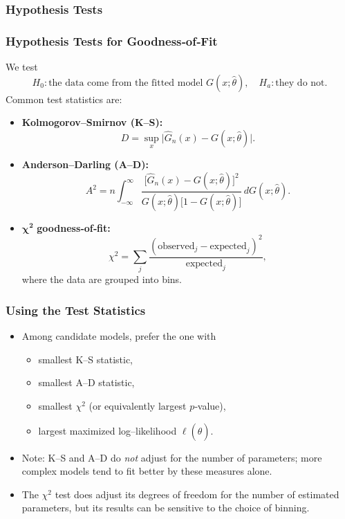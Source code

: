 \documentclass[11pt]{article}
\begin{document}
\subsubsection{Hypothesis Tests}
\subsubsection{Hypothesis Tests for Goodness‐of‐Fit}

We test
\[
  H_0: \text{the data come from the fitted model }G(x;\widehat\theta),
  \quad
  H_a: \text{they do not}.
\]
Common test statistics are:
\begin{itemize}
  \item \textbf{Kolmogorov–Smirnov (K–S):}
    \[
      D = \sup_x\bigl|\widehat G_n(x) - G(x;\widehat\theta)\bigr|.
    \]
  \item \textbf{Anderson–Darling (A–D):}
    \[
      A^2
      = n \int_{-\infty}^{\infty}
        \frac{\bigl[\widehat G_n(x) - G(x;\widehat\theta)\bigr]^2}
             {G(x;\widehat\theta)\bigl[1 - G(x;\widehat\theta)\bigr]}\,
        dG(x;\widehat\theta).
    \]
  \item \(\boldsymbol{\chi^2}\) \textbf{goodness‐of‐fit:}
    \[
      \chi^2
      = \sum_{j}
        \frac{(\text{observed}_j - \text{expected}_j)^2}
             {\text{expected}_j},
    \]
    where the data are grouped into bins.
\end{itemize}

\subsubsection{Using the Test Statistics}

\begin{itemize}
  \item Among candidate models, prefer the one with
    \begin{itemize}
      \item smallest K–S statistic,
      \item smallest A–D statistic,
      \item smallest \(\chi^2\) (or equivalently largest \(p\)‐value),
      \item largest maximized log–likelihood \(\ell(\widehat\theta)\).
    \end{itemize}
  \item Note: K–S and A–D do \emph{not} adjust for the number of parameters; more complex models tend to fit better by these measures alone.
  \item The \(\chi^2\) test does adjust its degrees of freedom for the number of estimated parameters, but its results can be sensitive to the choice of binning.
\end{itemize}
\end{document}
